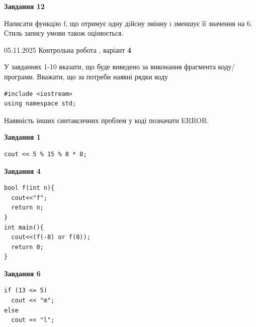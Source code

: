 \documentclass[12pt, ukrainian]{article}
\begin{document}
{\begin {large}
\begin{minipage}[t]{11.0cm}
\begin{center}
\textbf{Завдання 12}
\end{center}

Написати функцiю f, що отримує одну дiйсну змінну i зменшує її значення на 6. Стиль запису умови також оцінюється.\par

\end{minipage}

\end {large}}
\newpage

{\Large{05.11.2025 Контрольна робота , варіант  \No \textbf { 4 }\par}}
{
\begin {large}
У завданнях 1-10 вказати, що буде виведено за виконання фрагмента коду/про\-гра\-ми.
Вважати, що за потреби наявні рядки коду
\begin{verbatim}
#include <iostream>
using namespace std;
\end{verbatim}
Наявність інших синтаксичних проблем у коді позначати ERROR.

\begin{minipage}[t]{7.0cm}

\begin{center}
\textbf{Завдання 1}
\end{center}
\vspace{-8mm}

\begin{verbatim}
cout << 5 % 15 % 8 * 8;
\end{verbatim}



\begin{center}
\textbf{Завдання 4}
\end{center}
\vspace{-8mm}

\begin{verbatim}
bool f(int n){
  cout<<"f";
  return n;
}
int main(){
  cout<<(f(-8) or f(0));
  return 0;
}
\end{verbatim}



\begin{center}
\textbf{Завдання 6}
\end{center}
\vspace{-8mm}

\begin{verbatim}
if (13 <= 5)
  cout << "m";
else
  cout << "l";
\end{verbatim}




\end{minipage}
\end{large}}
\end{document}
